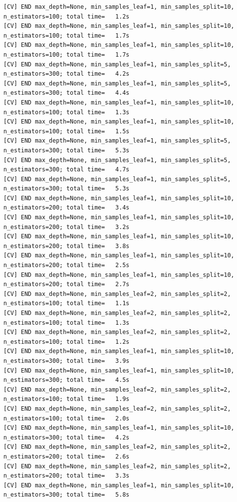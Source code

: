 \documentclass[
  11pt,
  letterpaper,
  DIV=11,
  numbers=noendperiod]{scrartcl}
\begin{document}
\begin{verbatim}
[CV] END max_depth=None, min_samples_leaf=1, min_samples_split=10, n_estimators=100; total time=   1.2s
[CV] END max_depth=None, min_samples_leaf=1, min_samples_split=10, n_estimators=100; total time=   1.7s
[CV] END max_depth=None, min_samples_leaf=1, min_samples_split=10, n_estimators=100; total time=   1.7s
[CV] END max_depth=None, min_samples_leaf=1, min_samples_split=5, n_estimators=300; total time=   4.2s
[CV] END max_depth=None, min_samples_leaf=1, min_samples_split=5, n_estimators=300; total time=   4.4s
[CV] END max_depth=None, min_samples_leaf=1, min_samples_split=10, n_estimators=100; total time=   1.3s
[CV] END max_depth=None, min_samples_leaf=1, min_samples_split=10, n_estimators=100; total time=   1.5s
[CV] END max_depth=None, min_samples_leaf=1, min_samples_split=5, n_estimators=300; total time=   5.3s
[CV] END max_depth=None, min_samples_leaf=1, min_samples_split=5, n_estimators=300; total time=   4.7s
[CV] END max_depth=None, min_samples_leaf=1, min_samples_split=5, n_estimators=300; total time=   5.3s
[CV] END max_depth=None, min_samples_leaf=1, min_samples_split=10, n_estimators=200; total time=   3.4s
[CV] END max_depth=None, min_samples_leaf=1, min_samples_split=10, n_estimators=200; total time=   3.2s
[CV] END max_depth=None, min_samples_leaf=1, min_samples_split=10, n_estimators=200; total time=   3.8s
[CV] END max_depth=None, min_samples_leaf=1, min_samples_split=10, n_estimators=200; total time=   2.5s
[CV] END max_depth=None, min_samples_leaf=1, min_samples_split=10, n_estimators=200; total time=   2.7s
[CV] END max_depth=None, min_samples_leaf=2, min_samples_split=2, n_estimators=100; total time=   1.1s
[CV] END max_depth=None, min_samples_leaf=2, min_samples_split=2, n_estimators=100; total time=   1.3s
[CV] END max_depth=None, min_samples_leaf=2, min_samples_split=2, n_estimators=100; total time=   1.2s
[CV] END max_depth=None, min_samples_leaf=1, min_samples_split=10, n_estimators=300; total time=   3.9s
[CV] END max_depth=None, min_samples_leaf=1, min_samples_split=10, n_estimators=300; total time=   4.5s
[CV] END max_depth=None, min_samples_leaf=2, min_samples_split=2, n_estimators=100; total time=   1.9s
[CV] END max_depth=None, min_samples_leaf=2, min_samples_split=2, n_estimators=100; total time=   2.0s
[CV] END max_depth=None, min_samples_leaf=1, min_samples_split=10, n_estimators=300; total time=   4.2s
[CV] END max_depth=None, min_samples_leaf=2, min_samples_split=2, n_estimators=200; total time=   2.6s
[CV] END max_depth=None, min_samples_leaf=2, min_samples_split=2, n_estimators=200; total time=   3.3s
[CV] END max_depth=None, min_samples_leaf=1, min_samples_split=10, n_estimators=300; total time=   5.8s

\end{verbatim}
\end{document}
